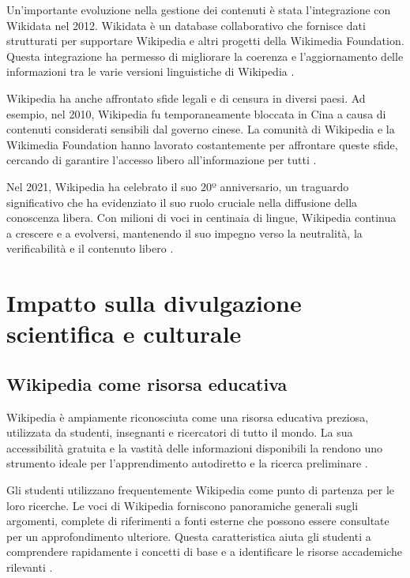 \documentclass[12pt,a4paper]{report}
\begin{document}
Un'importante evoluzione nella gestione dei contenuti è stata l'integrazione con Wikidata nel 2012. Wikidata è un database collaborativo che fornisce dati strutturati per supportare Wikipedia e altri progetti della Wikimedia Foundation. Questa integrazione ha permesso di migliorare la coerenza e l'aggiornamento delle informazioni tra le varie versioni linguistiche di Wikipedia \cite{history_of_wikis}.

Wikipedia ha anche affrontato sfide legali e di censura in diversi paesi. Ad esempio, nel 2010, Wikipedia fu temporaneamente bloccata in Cina a causa di contenuti considerati sensibili dal governo cinese. La comunità di Wikipedia e la Wikimedia Foundation hanno lavorato costantemente per affrontare queste sfide, cercando di garantire l'accesso libero all'informazione per tutti \cite{jemielniak2014wikipedia}.

Nel 2021, Wikipedia ha celebrato il suo 20º anniversario, un traguardo significativo che ha evidenziato il suo ruolo cruciale nella diffusione della conoscenza libera. Con milioni di voci in centinaia di lingue, Wikipedia continua a crescere e a evolversi, mantenendo il suo impegno verso la neutralità, la verificabilità e il contenuto libero \cite{reagle2010good}.

\section{Impatto sulla divulgazione scientifica e culturale}

\subsection{Wikipedia come risorsa educativa}

Wikipedia è ampiamente riconosciuta come una risorsa educativa preziosa, utilizzata da studenti, insegnanti e ricercatori di tutto il mondo. La sua accessibilità gratuita e la vastità delle informazioni disponibili la rendono uno strumento ideale per l'apprendimento autodiretto e la ricerca preliminare \cite{reagle2010good}.

Gli studenti utilizzano frequentemente Wikipedia come punto di partenza per le loro ricerche. Le voci di Wikipedia forniscono panoramiche generali sugli argomenti, complete di riferimenti a fonti esterne che possono essere consultate per un approfondimento ulteriore. Questa caratteristica aiuta gli studenti a comprendere rapidamente i concetti di base e a identificare le risorse accademiche rilevanti \cite{denning2005wikipedia}.
\end{document}
